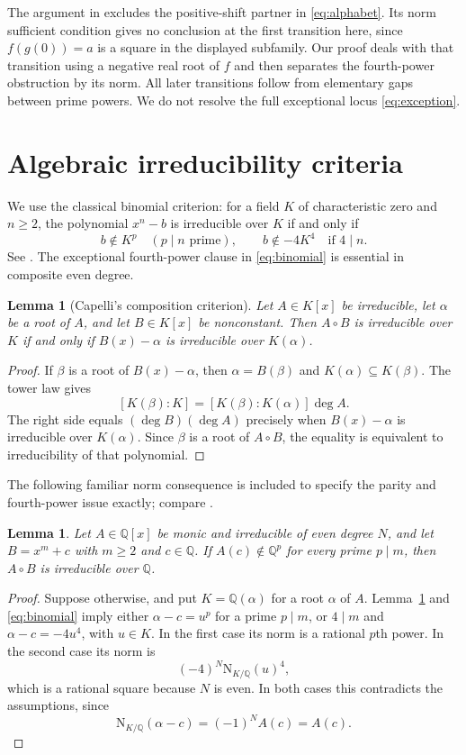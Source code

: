\documentclass[11pt]{article}
\newtheorem{lemma}[theorem]{Lemma}
\theoremstyle{remark}
\newcommand{\Q}{\mathbb{Q}}
\newcommand{\N}{\mathrm{N}}
\begin{document}
The argument in \cite[Proposition~3.8]{BBHQS} excludes the positive-shift partner in \eqref{eq:alphabet}. Its norm sufficient condition \cite[Proposition~3.1]{BBHQS} gives no conclusion at the first transition here, since $f(g(0))=a$ is a square in the displayed subfamily. Our proof deals with that transition using a negative real root of $f$ and then separates the fourth-power obstruction by its norm. All later transitions follow from elementary gaps between prime powers. We do not resolve the full exceptional locus \eqref{eq:exception}.

\section{Algebraic irreducibility criteria}
We use the classical binomial criterion: for a field $K$ of characteristic zero and $n\geq2$, the polynomial $x^n-b$ is irreducible over $K$ if and only if
\begin{equation}\label{eq:binomial}
 b\notin K^p\quad(p\mid n\text{ prime}),\qquad
 b\notin-4K^4\quad\text{if }4\mid n.
\end{equation}
See \cite[Chapter~VI, Section~9, Theorem~9.1]{Lang}. The exceptional fourth-power clause in \eqref{eq:binomial} is essential in composite even degree.

\begin{lemma}[Capelli's composition criterion]\label{lem:capelli}
Let $A\in K[x]$ be irreducible, let $\alpha$ be a root of $A$, and let $B\in K[x]$ be nonconstant. Then $A\circ B$ is irreducible over $K$ if and only if $B(x)-\alpha$ is irreducible over $K(\alpha)$.
\end{lemma}
\begin{proof}
If $\beta$ is a root of $B(x)-\alpha$, then $\alpha=B(\beta)$ and $K(\alpha)\subseteq K(\beta)$. The tower law gives
\[
 [K(\beta):K]=[K(\beta):K(\alpha)]\deg A.
\]
The right side equals $(\deg B)(\deg A)$ precisely when $B(x)-\alpha$ is irreducible over $K(\alpha)$. Since $\beta$ is a root of $A\circ B$, the equality is equivalent to irreducibility of that polynomial.
\end{proof}

The following familiar norm consequence is included to specify the parity and fourth-power issue exactly; compare \cite[Proposition~3.1]{BBHQS}.
\begin{lemma}\label{lem:norm}
Let $A\in\Q[x]$ be monic and irreducible of even degree $N$, and let $B=x^m+c$ with $m\geq2$ and $c\in\Q$. If $A(c)\notin\Q^p$ for every prime $p\mid m$, then $A\circ B$ is irreducible over $\Q$.
\end{lemma}
\begin{proof}
Suppose otherwise, and put $K=\Q(\alpha)$ for a root $\alpha$ of $A$. Lemma~\ref{lem:capelli} and \eqref{eq:binomial} imply either $\alpha-c=u^p$ for a prime $p\mid m$, or $4\mid m$ and $\alpha-c=-4u^4$, with $u\in K$. In the first case its norm is a rational $p$th power. In the second case its norm is
\[
 (-4)^N\N_{K/\Q}(u)^4,
\]
which is a rational square because $N$ is even. In both cases this contradicts the assumptions, since
\[
 \N_{K/\Q}(\alpha-c)=(-1)^N A(c)=A(c).
\]
\end{proof}
\end{document}
